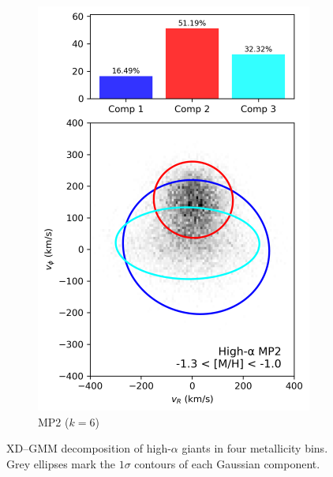 \documentclass[a4paper,12pt]{article}
\begin{document}
\begin{figure}[ht]
\begin{subfigure}{0.245\linewidth}
    \includegraphics[width=\linewidth]{../figures/gmm_mp2_high_alpha_k6.png}
    \caption{MP2 ($k{=}6$)}
    \label{fig:mp2_hi}
  \end{subfigure}

  \caption{XD--GMM decomposition of high-$\alpha$ giants in four metallicity bins. Grey ellipses mark the $1\sigma$ contours of each Gaussian component.}
  \label{fig:gmm_4wide_hi}
\end{figure}
\end{document}
